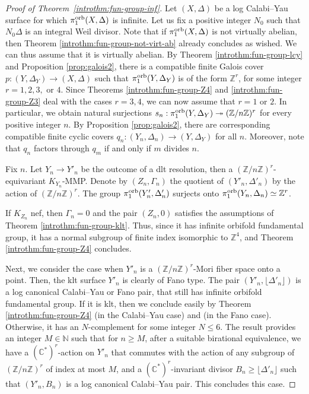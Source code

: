 \documentclass{amsart}
\newcommand{\zz}{\mathbb{Z}}
\newcommand{\nn}{\mathbb{N}}
\newcommand{\cc}{\mathbb{C}}
\theoremstyle{definition}
\theoremstyle{remark}
\numberwithin{equation}{section}
\begin{document}
\begin{proof}[Proof of Theorem~\ref{introthm:fun-group-inf}]
Let $(X,\Delta)$ be a log Calabi--Yau surface for which $\pi_1^{\rm orb}(X,\Delta)$ is infinite. Let us fix a positive integer $N_0$ such that $N_0\Delta$ is an integral Weil divisor. Note that if $\pi_1^{\rm orb}(X,\Delta)$ is not virtually abelian, then Theorem \ref{introthm:fun-group-not-virt-ab} already concludes as wished. We can thus assume that it is virtually abelian. By Theorem \ref{introthm:fun-group-lcy} and Proposition \ref{prop:galois2}, there is a compatible finite Galois cover
$p:(Y,\Delta_Y)\to (X,\Delta)$ such that $\pi_1^{\rm orb}(Y,\Delta_Y)$ is of the form $\zz^r$, for some integer $r=1,2,3,$ or $4$. Since Theorems \ref{introthm:fun-group-Z4} and \ref{introthm:fun-group-Z3} deal with the cases $r=3,4$, we can now assume that $r=1$ or $2$. In particular, we obtain natural surjections $s_n:\pi_1^{\rm orb}(Y,\Delta_Y)\twoheadrightarrow (\zz/n\zz)^r$ for every positive integer $n$. By Proposition \ref{prop:galois2}, there are corresponding compatible finite cyclic covers $q_n:(Y_n,\Delta_n)\to (Y,\Delta_Y)$ for all $n$. Moreover, note that $q_n$ factors through $q_m$ if and only if $m$ divides $n$.

Fix $n$. Let $Y_n\to Y'_n$ be the outcome of a dlt resolution, then a $(\zz/n\zz)^r$-equivariant $K_{Y_n}$-MMP. Denote by $(Z_n,\Gamma_n)$ the quotient of $(Y'_n,\Delta'_n)$ by the action of $(\zz/n\zz)^r$. 
The group $\pi_1^{\rm orb}(Y'_n,\Delta'_n)$ surjects onto $\pi_1^{\rm orb}(Y_n,\Delta_n)\simeq \zz^r$. 

If $K_{Z_n}$ nef, then $\Gamma_n=0$ and the pair $(Z_n,0)$ satisfies the assumptions of Theorem \ref{introthm:fun-group-klt}. Thus, since it has infinite orbifold fundamental group, it has a normal subgroup of finite index isomorphic to $\zz^4$, and Theorem \ref{introthm:fun-group-Z4} concludes. 

Next, we consider the case when $Y'_n$ is a $(\zz/n\zz)^r$-Mori fiber space onto a point. Then, the klt surface $Y'_n$ is clearly of Fano type. The pair $(Y'_n,\lfloor \Delta'_n\rfloor)$ is a log canonical Calabi--Yau or Fano pair, that still has infinite orbifold fundamental group. If it is klt, then we conclude easily by Theorem \ref{introthm:fun-group-Z4} (in the Calabi--Yau case) and \cite{Bra20} (in the Fano case). Otherwise, it has an $N$-complement for some integer $N\le 6$. The result \cite[Theorem 3.2]{Mor20b} provides an integer $M\in\nn$ such that for $n\ge M$, after a suitable birational equivalence, we have a $(\cc^*)^r$-action on $Y'_n$ that commutes with the action of any subgroup of $(\zz/n\zz)^r$ of index at most $M$, and a $(\cc^*)^r$-invariant divisor $B_n\ge \lfloor\Delta'_n\rfloor$ such that $(Y'_n,B_n)$ is a log canonical Calabi--Yau pair. This concludes this case.



\end{proof}
\end{document}
